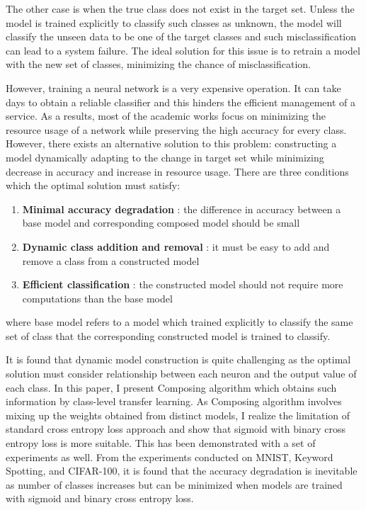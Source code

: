 \documentclass{article}
\begin{document}
The other case is when the true class does not exist in the target set. Unless the model is trained explicitly to classify such classes as unknown, the model will classify the unseen data to be one of the target classes and such misclassification can lead to a system failure. The ideal solution for this issue is to retrain a model with the new set of classes, minimizing the chance of misclassification.

However, training a neural network is a very expensive operation. It can take days to obtain a reliable classifier and this hinders the efficient management of a service. As a results, most of the academic works focus on minimizing the resource usage of a network while preserving the high accuracy for every class. However, there exists an alternative solution to this problem: constructing a model dynamically adapting to the change in target set while minimizing decrease in accuracy and increase in resource usage. There are three conditions which the optimal solution must satisfy:

\begin{enumerate}
    \item \textbf{Minimal accuracy degradation} : the difference in accuracy between a base model and corresponding composed model should be small
    \item \textbf{Dynamic class addition and removal} : it must be easy to add and remove a class from a constructed model
    \item \textbf{Efficient classification} : the constructed model should not require more computations than the base model
\end{enumerate}

where base model refers to a model which trained explicitly to classify the same set of class that the corresponding constructed model is trained to classify.

It is found that dynamic model construction is quite challenging as the optimal solution must consider relationship between each neuron and the output value of each class. In this paper, I present Composing algorithm which obtains such information by class-level transfer learning. As Composing algorithm involves mixing up the weights obtained from distinct models, I realize the limitation of standard cross entropy loss approach and show that sigmoid with binary cross entropy loss is more suitable. This has been demonstrated with a set of experiments as well. From the experiments conducted on MNIST, Keyword Spotting, and CIFAR-100, it is found that the accuracy degradation is inevitable as number of classes increases but can be minimized when models are trained with sigmoid and binary cross entropy loss.
\end{document}
